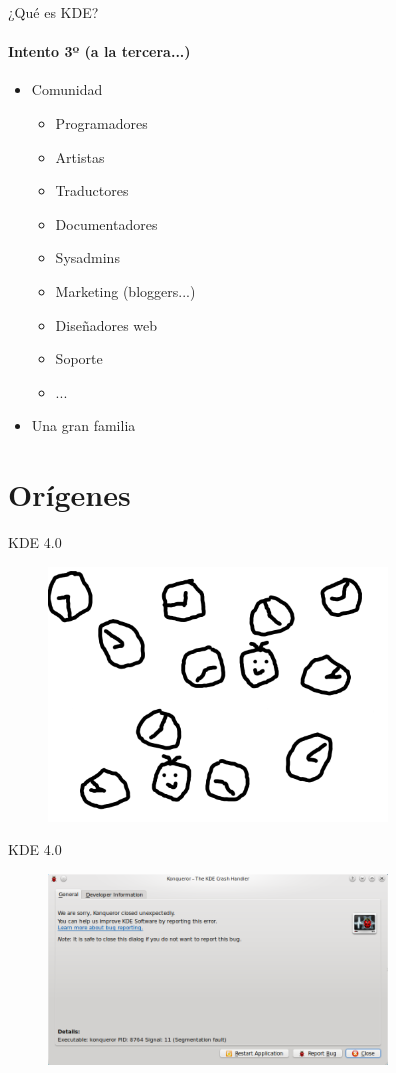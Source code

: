 \documentclass[12pt]{beamer}
\begin{document}
\begin{frame}{¿Qué es KDE?}
    \framesubtitle{Intento 3º (a la tercera...)}
    \begin{itemize}
        \item Comunidad
        \pause
        \begin{itemize}
            \item Programadores
            \item Artistas
            \item Traductores
            \item Documentadores
            \item Sysadmins
            \item Marketing (bloggers...)
            \item Diseñadores web
            \item Soporte
            \item ...
        \end{itemize}
        \pause
        \item Una gran familia
    \end{itemize}
\end{frame}

\section{Orígenes}

\begin{frame}{KDE 4.0}
    \center
    \begin{figure}
        \includegraphics[width=9cm]{kde40.png}
    \end{figure}
\end{frame}

\begin{frame}{KDE 4.0}
    \center
    \begin{figure}
        \includegraphics[width=9cm]{snapshot3.png}
    \end{figure}
\end{frame}
\end{document}
